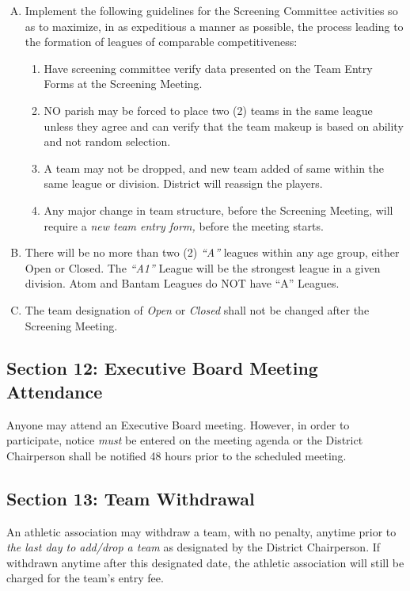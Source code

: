 \begin{enumerate}[A.]
    \item Implement the following guidelines for the Screening Committee activities so as to maximize, in as expeditious a manner as possible, the process leading to the formation of leagues of comparable competitiveness:
    \begin{enumerate}[1.]
        \item Have screening committee verify data presented on the Team Entry Forms at the Screening Meeting.
        \item NO parish may be forced to place two (2) teams in the same league unless they agree and can verify that the team makeup is based on ability and not random selection.
        \item A team may not be dropped, and new team added of same within the same league or division. District will reassign the players.
        \item Any major change in team structure, before the Screening Meeting, will require a {\em new team entry form,} before the meeting starts.
    \end{enumerate}
    \item There will be no more than two (2) {\em ``A''} leagues within any age group, either Open or Closed.  The {\em ``A1''} League will be the strongest league in a given division.  Atom and Bantam Leagues do NOT have “A” Leagues.
    \item The team designation of {\em Open} or {\em Closed} shall not be changed after the Screening Meeting.
\end{enumerate}

\subsection{Section 12: Executive Board Meeting Attendance}
\label{ssec:rules-g-12}
Anyone may attend an Executive Board meeting.  However, in order to participate, notice {\em must} be entered on the meeting agenda or the District Chairperson shall be notified 48 hours prior to the scheduled meeting.

\subsection{Section 13: Team Withdrawal}
\label{ssec:rules-g-13}
An athletic association may withdraw a team, with no penalty, anytime prior to {\em the last day to add/drop a team} as designated by the District Chairperson.  If withdrawn anytime after this designated date, the athletic association will still be charged for the team's entry fee.


    
    
    

\backmatter

